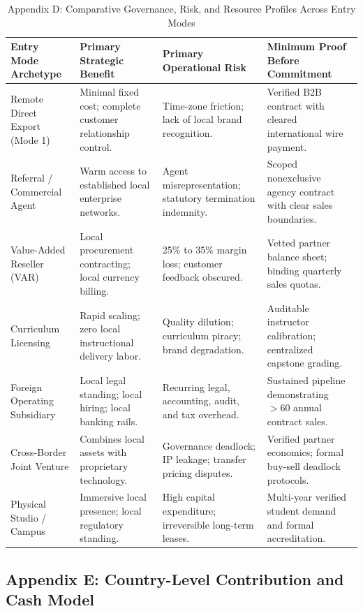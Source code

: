 \begin{table}[t]
\centering
\small
\caption{Appendix D: Comparative Governance, Risk, and Resource Profiles Across Entry Modes}
\label{tab:app_entry_modes}
\begin{tabularx}{\textwidth}{p{3.2cm} p{3.2cm} p{3.6cm} X}
\toprule
\textbf{Entry Mode Archetype} & \textbf{Primary Strategic Benefit} & \textbf{Primary Operational Risk} & \textbf{Minimum Proof Before Commitment} \\
\midrule
Remote Direct Export (Mode 1) & Minimal fixed cost; complete customer relationship control. & Time-zone friction; lack of local brand recognition. & Verified B2B contract with cleared international wire payment. \\
Referral / Commercial Agent & Warm access to established local enterprise networks. & Agent misrepresentation; statutory termination indemnity. & Scoped nonexclusive agency contract with clear sales boundaries. \\
Value-Added Reseller (VAR) & Local procurement contracting; local currency billing. & 25\% to 35\% margin loss; customer feedback obscured. & Vetted partner balance sheet; binding quarterly sales quotas. \\
Curriculum Licensing & Rapid scaling; zero local instructional delivery labor. & Quality dilution; curriculum piracy; brand degradation. & Auditable instructor calibration; centralized capstone grading. \\
Foreign Operating Subsidiary & Local legal standing; local hiring; local banking rails. & Recurring legal, accounting, audit, and tax overhead. & Sustained pipeline demonstrating $>60$ annual contract sales. \\
Cross-Border Joint Venture & Combines local assets with proprietary technology. & Governance deadlock; IP leakage; transfer pricing disputes. & Verified partner economics; formal buy-sell deadlock protocols. \\
Physical Studio / Campus & Immersive local presence; local regulatory standing. & High capital expenditure; irreversible long-term leases. & Multi-year verified student demand and formal accreditation. \\
\bottomrule
\end{tabularx}
\end{table}

\subsection{Appendix E: Country-Level Contribution and Cash Model}

